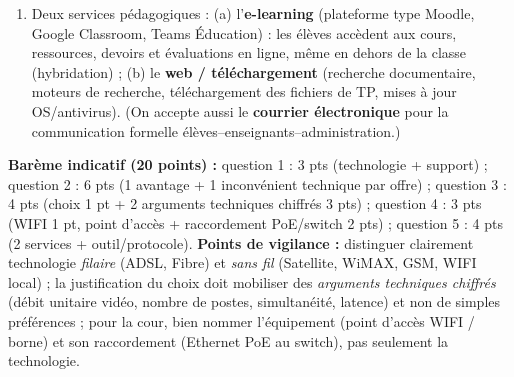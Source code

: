 \documentclass[11pt]{article}
\begin{document}
\begin{corrige}
\begin{enumerate}
    \item Deux services pédagogiques : (a) l'\textbf{e-learning} (plateforme type Moodle, Google Classroom, Teams Éducation) : les élèves accèdent aux cours, ressources, devoirs et évaluations en ligne, même en dehors de la classe (hybridation) ; (b) le \textbf{web / téléchargement} (recherche documentaire, moteurs de recherche, téléchargement des fichiers de TP, mises à jour OS/antivirus). (On accepte aussi le \textbf{courrier électronique} pour la communication formelle élèves--enseignants--administration.)
\end{enumerate}
\textbf{Barème indicatif (20 points) :} question 1 : 3 pts (technologie + support) ; question 2 : 6 pts (1 avantage + 1 inconvénient technique par offre) ; question 3 : 4 pts (choix 1 pt + 2 arguments techniques chiffrés 3 pts) ; question 4 : 3 pts (WIFI 1 pt, point d'accès + raccordement PoE/switch 2 pts) ; question 5 : 4 pts (2 services + outil/protocole).
\textbf{Points de vigilance :} distinguer clairement technologie \emph{filaire} (ADSL, Fibre) et \emph{sans fil} (Satellite, WiMAX, GSM, WIFI local) ; la justification du choix doit mobiliser des \emph{arguments techniques chiffrés} (débit unitaire vidéo, nombre de postes, simultanéité, latence) et non de simples préférences ; pour la cour, bien nommer l'équipement (point d'accès WIFI / borne) et son raccordement (Ethernet PoE au switch), pas seulement la technologie.
\end{corrige}
\end{document}
